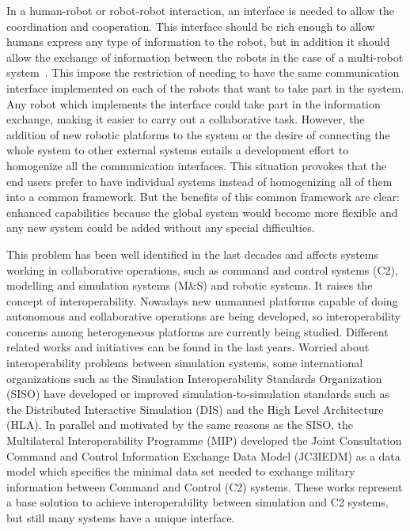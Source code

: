 \documentclass[twocolumn]{svjour3}          %
\begin{document}
In a human-robot or robot-robot interaction, an interface is needed to allow the coordination and cooperation. This interface should be rich enough to allow humans express any type of information to the robot, 
but in addition it should allow the exchange of information between the robots in the case of a multi-robot system~\cite{maza_jint10_multimodal,perez_jint13}. This impose the restriction of needing to have the same communication interface 
implemented on each of the robots that want to take part in the system. Any robot which implements the interface could take part in the information exchange, making it easier to carry out a 
collaborative task. However, the addition of new robotic platforms to the system or the desire of connecting the whole system to other external systems entails a development effort to homogenize 
all the communication interfaces. This situation provokes that the end users prefer to have individual systems instead of homogenizing all of them into a common framework. But the benefits of this common 
framework are clear: enhanced capabilities because the global system would become more flexible and any new system could be added without any special difficulties.

This problem has been well identified in the last decades and affects systems working in collaborative operations, such as command and control systems (C2), 
modelling and simulation systems (M\&S) and robotic systems. It raises the concept of interoperability. Nowadays new unmanned platforms capable of doing 
autonomous and collaborative operations are being developed, so interoperability concerns among heterogeneous platforms are currently being studied. Different 
related works and initiatives can be found in the last years. Worried about interoperability problems between simulation systems, some international organizations 
such as the Simulation Interoperability Standards Organization (SISO) have developed or improved simulation-to-simulation 
standards such as the Distributed Interactive Simulation (DIS) and the High Level Architecture (HLA). In parallel and motivated by the same reasons as the
SISO, the Multilateral Interoperability Programme (MIP) developed the Joint Consultation Command and Control Information Exchange Data Model (JC3IEDM)
as a data model which specifies the minimal data set needed to exchange military information between Command and Control (C2) systems. These works
represent a base solution to achieve interoperability between simulation and C2 systems, but still many systems have a unique interface.
\end{document}

